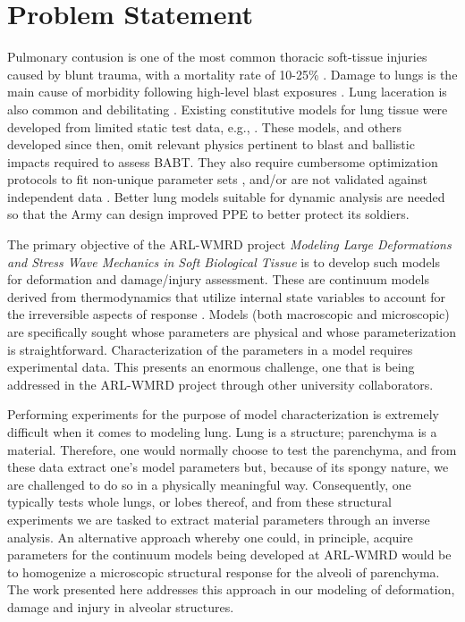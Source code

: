 \section{Problem Statement}

Pulmonary contusion is one of the most common thoracic soft-tissue injuries caused by blunt trauma, with a mortality rate of 10-25\% \citep{Stitzeletal05}.  Damage to lungs is the main cause of morbidity following high-level blast exposures \citep{Stuhmilleretal88}.  Lung laceration is also common and debilitating \citep{VlessisTrunkey97}.  Existing constitutive models for lung tissue were developed from limited static test data, e.g., \cite{Fungetal78,Vawteretal79,Vawter80}.  These models, and others developed since then, omit relevant physics pertinent to blast and ballistic impacts required to assess BABT.  They also require cumbersome optimization protocols to fit non-unique parameter sets \citep{Gayziketal07,Gayziketal11}, and\slash or are not validated against independent data \citep{Yuenetal08}.  Better lung models suitable for dynamic analysis are needed so that the Army can design improved PPE to better protect its soldiers.

The primary objective of the ARL-WMRD project \textit{Modeling Large Deformations and Stress Wave Mechanics in Soft Biological Tissue\/} is to develop such models for deformation and damage\slash injury assessment.  These are continuum models derived from thermo\-dynamics that utilize internal state variables to account for the irreversible aspects of response \cite{ClaytonFreed19}.  Models (both macro\-scopic and micro\-scopic) are specifically sought whose parameters are physical and whose parameterization is straightforward.  Characterization of the parameters in a model requires experimental data.  This presents an enormous challenge, one that is being addressed in the ARL-WMRD project through other university collaborators.  

Performing experiments for the purpose of model characterization is extremely difficult when it comes to modeling lung.  Lung is a structure; parenchyma is a material.  Therefore, one would normally choose to test the parenchyma, and from these data extract one's model parameters but, because of its spongy nature, we are challenged to do so in a physically meaningful way.  Consequently, one typically tests whole lungs, or lobes thereof, and from these structural experiments we are tasked to extract material parameters through an inverse analysis.  An alternative approach whereby one could, in principle, acquire parameters for the continuum models being developed at ARL-WMRD would be to homo\-genize a microscopic structural response for the alveoli of parenchyma.  The work presented here addresses this approach in our modeling of deformation, damage and injury in alveolar structures.

